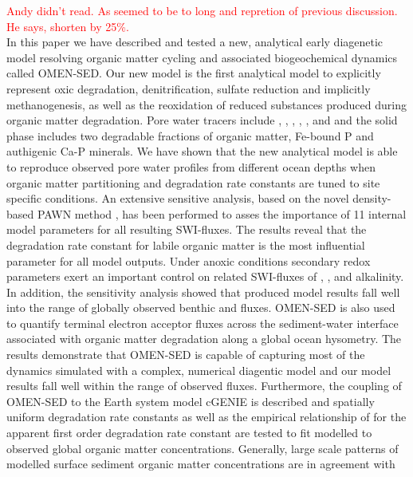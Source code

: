 \documentclass[gmd, manuscript]{copernicus}
\begin{document}
\conclusions  %
\textcolor{red}{Andy didn't read. As seemed to be to long and repretion of previous discussion. He says, shorten by 25\%.}\\
In this paper we have described and tested a new, analytical early diagenetic model resolving organic matter cycling and associated biogeochemical dynamics called OMEN-SED. 
Our new model is the first analytical model to explicitly represent oxic degradation, denitrification, sulfate reduction and implicitly methanogenesis, 
as well as the reoxidation of reduced substances produced during organic matter degradation. Pore water tracers include , , , , ,  and  and the solid phase includes 
two degradable fractions of organic matter, Fe-bound P and authigenic Ca-P minerals. 
We have shown that the new analytical model is able to reproduce observed pore water profiles from different ocean depths when organic matter partitioning and degradation rate constants are tuned to site specific conditions. An extensive sensitive analysis, 
based on the novel density-based PAWN method \citep{pianosi_simple_2015}, has been performed to asses the importance of 11 internal model parameters for all resulting SWI-fluxes. The results reveal that the degradation rate constant for labile organic 
matter is the most influential parameter for all model outputs. Under anoxic conditions secondary redox parameters exert an important control on related SWI-fluxes of , ,  and alkalinity. 
In addition, the sensitivity analysis showed that produced model results fall well into the range of globally observed benthic  and  fluxes. 
OMEN-SED is also used to quantify terminal electron acceptor fluxes across the sediment-water interface associated with organic matter degradation along a global ocean hysometry. 
The results demonstrate that OMEN-SED is capable of capturing most of the dynamics simulated with a complex, numerical diagentic model and our model results fall well 
within the range of observed fluxes. 
Furthermore, the coupling of OMEN-SED to the Earth system model cGENIE is described and spatially uniform degradation rate constants as well as the empirical relationship of \citet{boudreau1997diagenetic} for 
the apparent first order degradation rate constant are tested to fit modelled to observed global organic matter concentrations. Generally, large scale patterns of modelled surface sediment organic matter concentrations are in agreement with 
\end{document}
